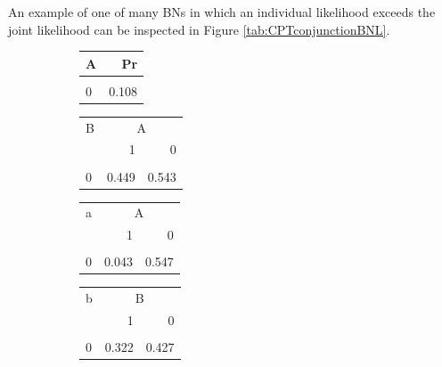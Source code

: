 \documentclass[
  10pt,
  dvipsnames,enabledeprecatedfontcommands]{scrartcl}
\begin{document}
An example of one of many \textsf{BNs} in which an individual likelihood
exceeds the joint likelihood can be inspected in Figure
\ref{tab:CPTconjunctionBNL}.

\begin{figure}
\begin{subfigure}[!ht]{0.45\textwidth}

\footnotesize 
\begin{tabular}{lr}
\toprule
A & Pr\\
\midrule
\cellcolor{gray!6}{1} & \cellcolor{gray!6}{0.892}\\
0 & 0.108\\
\bottomrule
\end{tabular}

\vspace{2mm}

\begin{tabular}{lrr}
\toprule
\multicolumn{1}{c}{B} & \multicolumn{2}{c}{A} \\
  & 1 & 0\\
\midrule
\cellcolor{gray!6}{1} & \cellcolor{gray!6}{0.551} & \cellcolor{gray!6}{0.457}\\
0 & 0.449 & 0.543\\
\bottomrule
\end{tabular}

\vspace{2mm}

\begin{tabular}{lrr}
\toprule
\multicolumn{1}{c}{a} & \multicolumn{2}{c}{A} \\
  & 1 & 0\\
\midrule
\cellcolor{gray!6}{1} & \cellcolor{gray!6}{0.957} & \cellcolor{gray!6}{0.453}\\
0 & 0.043 & 0.547\\
\bottomrule
\end{tabular}


\vspace{2mm}

\begin{tabular}{lrr}
\toprule
\multicolumn{1}{c}{b} & \multicolumn{2}{c}{B} \\
  & 1 & 0\\
\midrule
\cellcolor{gray!6}{1} & \cellcolor{gray!6}{0.678} & \cellcolor{gray!6}{0.573}\\
0 & 0.322 & 0.427\\
\bottomrule
\end{tabular}

\vspace{2mm}


\end{subfigure}
\end{figure}
\end{document}
